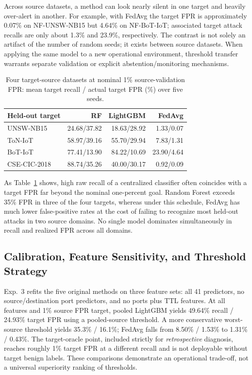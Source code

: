 \documentclass[journal,10pt]{IEEEtran}
\begin{document}
Across source datasets, a method can look nearly silent in one target and heavily over-alert in another. For example, with FedAvg the target FPR is approximately 0.07\% on NF-UNSW-NB15 but 4.64\% on NF-BoT-IoT; associated target attack recalls are only about 1.3\% and 23.9\%, respectively. The contrast is not solely an artifact of the number of random seeds; it exists between source datasets. When applying the same model to a new operational environment, threshold transfer warrants separate validation or explicit abstention/monitoring mechanisms.

\begin{table}[t]
\centering
\caption{Four target-source datasets at nominal 1\% source-validation FPR: mean target recall / actual target FPR (\%) over five seeds.}
\label{tab:per_domain}
\scriptsize\setlength{\tabcolsep}{3pt}
\begin{tabular}{@{}lrrr@{}}
\toprule
\textbf{Held-out target} & \textbf{RF} & \textbf{LightGBM} & \textbf{FedAvg}\\
\midrule
UNSW-NB15 & 24.68/37.82 & 18.63/28.92 & 1.33/0.07\\
ToN-IoT & 58.97/39.16 & 55.70/29.94 & 7.83/1.31\\
BoT-IoT & 77.41/13.90 & 84.22/10.69 & 23.90/4.64\\
CSE-CIC-2018 & 88.74/35.26 & 40.00/30.17 & 0.92/0.09\\
\bottomrule
\end{tabular}
\end{table}

As Table~\ref{tab:per_domain} shows, high raw recall of a centralized classifier often coincides with a target FPR far beyond the nominal one-percent goal. Random Forest exceeds 35\% FPR in three of the four targets, whereas under this schedule, FedAvg has much lower false-positive rates at the cost of failing to recognize most held-out attacks in two source domains. No single model dominates simultaneously in recall and realized FPR across all domains.

\subsection{Calibration, Feature Sensitivity, and Threshold Strategy}
Exp.~3 refits the five original methods on three feature sets: all 41 predictors, no source/destination port predictors, and no ports plus TTL features. At all features and 1\% source FPR target, pooled LightGBM yields 49.64\% recall / 24.93\% target FPR using a pooled-source threshold. A more conservative worst-source threshold yields 35.3\% / 16.1\%; FedAvg falls from 8.50\% / 1.53\% to 1.31\% / 0.43\%. The target-oracle point, included strictly for \emph{retrospective} diagnosis, reaches roughly 1\% target FPR at a different recall and is not deployable without target benign labels. These comparisons demonstrate an operational trade-off, not a universal superiority ranking of thresholds.
\end{document}
